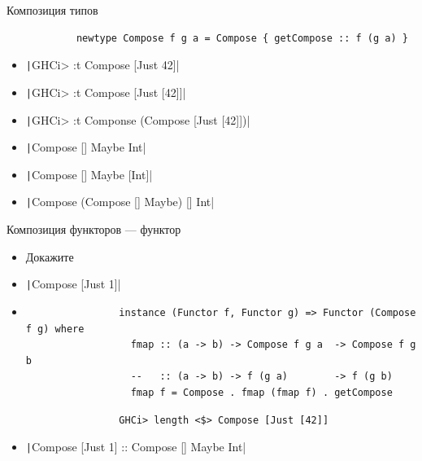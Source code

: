     \begin{frame}[fragile]{Композиция типов}
        \vspace{-0.5em}
        \pause
        \begin{verbatim}
            newtype Compose f g a = Compose { getCompose :: f (g a) }
        \end{verbatim}
        \begin{itemize}
            \item[\todo] \pause \texttt|GHCi> :t Compose [Just 42]|
            \item[\todo] \pause \texttt|GHCi> :t Compose [Just [42]]|
            \item[\todo] \pause \texttt|GHCi> :t Componse (Compose [Just [42]])|
            \item[\answer] \pause \texttt|Compose [] Maybe Int|
            \item[\answer] \pause \texttt|Compose [] Maybe [Int]|
            \item[\answer] \pause \texttt|Compose (Compose [] Maybe) [] Int|
        \end{itemize}
    \end{frame}

    \begin{frame}[fragile]{Композиция функторов --- функтор}
        \begin{itemize}
            \item[\todo] Докажите
            \item[\todo] \texttt|Compose [Just 1]|
            \item[\answer] \pause
            \begin{verbatim}
                instance (Functor f, Functor g) => Functor (Compose f g) where
                  fmap :: (a -> b) -> Compose f g a  -> Compose f g b
                  --   :: (a -> b) -> f (g a)        -> f (g b)
                  fmap f = Compose . fmap (fmap f) . getCompose
            \end{verbatim}
            \begin{verbatim}
                GHCi> length <$> Compose [Just [42]]
            \end{verbatim}
            \item[\answer] \pause \texttt|Compose [Just 1] :: Compose [] Maybe Int|
        \end{itemize}
    \end{frame}

